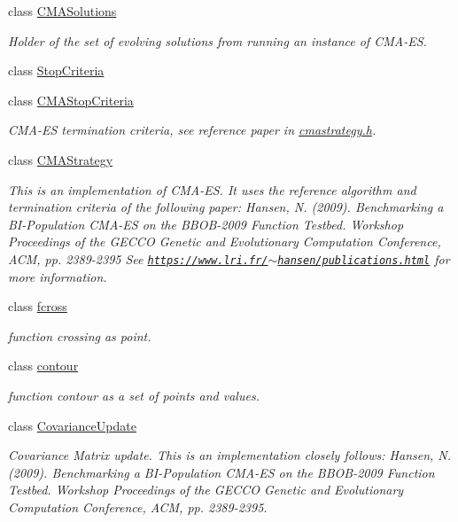 \begin{DoxyCompactItemize}
class \hyperlink{classlibcmaes_1_1CMASolutions}{C\-M\-A\-Solutions}
\begin{DoxyCompactList}\small\item\em Holder of the set of evolving solutions from running an instance of C\-M\-A-\/\-E\-S. \end{DoxyCompactList}\item 
class \hyperlink{classlibcmaes_1_1StopCriteria}{Stop\-Criteria}
\item 
class \hyperlink{classlibcmaes_1_1CMAStopCriteria}{C\-M\-A\-Stop\-Criteria}
\begin{DoxyCompactList}\small\item\em C\-M\-A-\/\-E\-S termination criteria, see reference paper in \hyperlink{cmastrategy_8h_source}{cmastrategy.\-h}. \end{DoxyCompactList}\item 
class \hyperlink{classlibcmaes_1_1CMAStrategy}{C\-M\-A\-Strategy}
\begin{DoxyCompactList}\small\item\em This is an implementation of C\-M\-A-\/\-E\-S. It uses the reference algorithm and termination criteria of the following paper\-: Hansen, N. (2009). Benchmarking a B\-I-\/\-Population C\-M\-A-\/\-E\-S on the B\-B\-O\-B-\/2009 Function Testbed. Workshop Proceedings of the G\-E\-C\-C\-O Genetic and Evolutionary Computation Conference, A\-C\-M, pp. 2389-\/2395 See \href{https://www.lri.fr/~hansen/publications.html}{\tt https\-://www.\-lri.\-fr/$\sim$hansen/publications.\-html} for more information. \end{DoxyCompactList}\item 
class \hyperlink{classlibcmaes_1_1fcross}{fcross}
\begin{DoxyCompactList}\small\item\em function crossing as point. \end{DoxyCompactList}\item 
class \hyperlink{classlibcmaes_1_1contour}{contour}
\begin{DoxyCompactList}\small\item\em function contour as a set of points and values. \end{DoxyCompactList}\item 
class \hyperlink{classlibcmaes_1_1CovarianceUpdate}{Covariance\-Update}
\begin{DoxyCompactList}\small\item\em Covariance Matrix update. This is an implementation closely follows\-: Hansen, N. (2009). Benchmarking a B\-I-\/\-Population C\-M\-A-\/\-E\-S on the B\-B\-O\-B-\/2009 Function Testbed. Workshop Proceedings of the G\-E\-C\-C\-O Genetic and Evolutionary Computation Conference, A\-C\-M, pp. 2389-\/2395. \end{DoxyCompactList}\item 

\end{DoxyCompactItemize}
